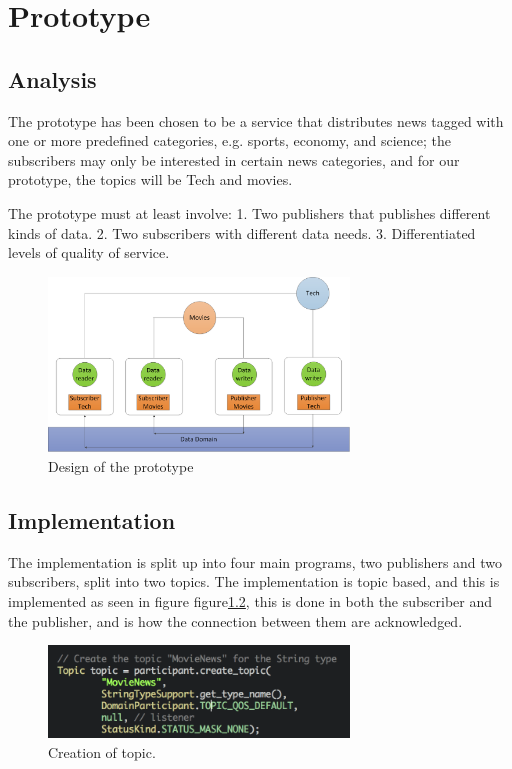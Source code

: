 \chapter{Prototype}
\section{Analysis}
The prototype has been chosen to be a service that distributes news tagged with one or more predefined categories,
e.g. sports, economy, and science; the subscribers may only be interested in certain news
categories, and for our prototype, the topics will be Tech and movies.

The prototype must at least involve:
1. Two publishers that publishes different kinds of data.
2. Two subscribers with different data needs.
3. Differentiated levels of quality of service.

\begin{figure}[ht!]
\centering
\includegraphics[width=80mm]{img/DDS_Prototype.png}
\caption{Design of the prototype}
\label{DDSPrototype}
\end{figure}

\section{Implementation}
The implementation is split up into four main programs, two publishers and two subscribers, split into two topics. The implementation is topic based, and this is implemented as seen in figure figure\ref{TopicCreation}, this is done in both the subscriber and the publisher, and is how the connection between them are acknowledged.

\begin{figure}[ht!]
\centering
\includegraphics[width=80mm]{img/TopicCreation.png}
\caption{Creation of topic.}
\label{TopicCreation}
\end{figure}

